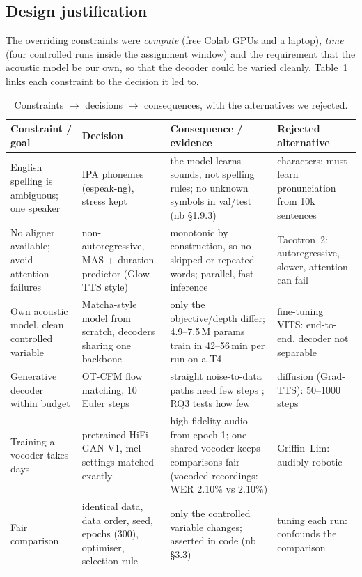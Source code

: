 \documentclass[11pt,a4paper]{article}
\begin{document}
\subsection{Design justification}
The overriding constraints were \emph{compute} (free Colab GPUs and a laptop), \emph{time} (four controlled runs inside the assignment window) and the requirement that the acoustic model be our own, so that the decoder could be varied cleanly. Table~\ref{tab:justify} links each constraint to the decision it led to.

\begin{table}[H]
\centering\small
\caption{Constraints $\rightarrow$ decisions $\rightarrow$ consequences, with the alternatives we rejected.}
\label{tab:justify}
\begin{tabularx}{\linewidth}{@{}>{\raggedright\arraybackslash}p{2.6cm}>{\raggedright\arraybackslash}p{3.7cm}>{\raggedright\arraybackslash}X>{\raggedright\arraybackslash}p{3.2cm}@{}}
\toprule
Constraint / goal & Decision & Consequence / evidence & Rejected alternative \\ \midrule
English spelling is ambiguous; one speaker & IPA phonemes (espeak-ng), stress kept & the model learns sounds, not spelling rules; no unknown symbols in val/test (nb §1.9.3) & characters: must learn pronunciation from 10k sentences \\
No aligner available; avoid attention failures & non-autoregressive, MAS + duration predictor (Glow-TTS style) & monotonic by construction, so no skipped or repeated words; parallel, fast inference & Tacotron~2: autoregressive, slower, attention can fail \\
Own acoustic model, clean controlled variable & Matcha-style model from scratch, decoders sharing one backbone & only the objective/depth differ; 4.9--7.5\,M params train in 42--56\,min per run on a T4 & fine-tuning VITS: end-to-end, decoder not separable \\
Generative decoder within budget & OT-CFM flow matching, 10 Euler steps & straight noise-to-data paths need few steps \citep{mehta2024matcha}; RQ3 tests how few & diffusion (Grad-TTS): 50--1000 steps \\
Training a vocoder takes days & pretrained HiFi-GAN V1, mel settings matched exactly & high-fidelity audio from epoch 1; one shared vocoder keeps comparisons fair (vocoded recordings: WER 2.10\% vs 2.10\%) & Griffin--Lim: audibly robotic \\
Fair comparison & identical data, data order, seed, epochs (300), optimiser, selection rule & only the controlled variable changes; asserted in code (nb §3.3) & tuning each run: confounds the comparison \\ \bottomrule
\end{tabularx}
\end{table}
\end{document}
